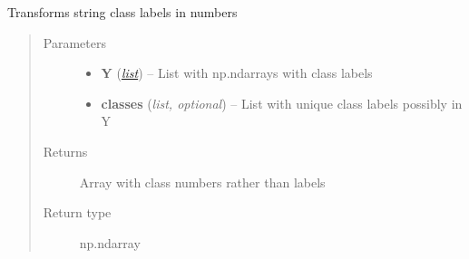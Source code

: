 \documentclass[letterpaper,10pt,english]{sphinxmanual}
\begin{document}
\begin{fulllineitems}
\label{classification:flamingo.classification.utils.labels2int}
Transforms string class labels in numbers
\begin{quote}\begin{description}
\item[{Parameters}] \leavevmode\begin{itemize}
\item {} 
\textbf{Y} (\href{http://docs.python.org/library/functions.html\#list}{\emph{list}}) -- List with np.ndarrays with class labels

\item {} 
\textbf{classes} (\emph{list, optional}) -- List with unique class labels possibly in Y

\end{itemize}

\item[{Returns}] \leavevmode
Array with class numbers rather than labels

\item[{Return type}] \leavevmode
np.ndarray

\end{description}\end{quote}

\end{fulllineitems}

\end{document}
